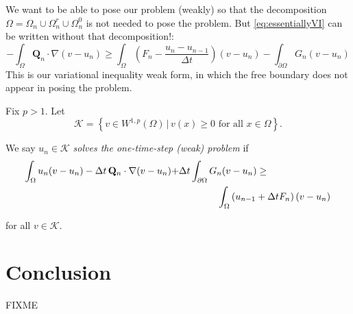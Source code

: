 \documentclass[final,leqno,onefignum,onetabnum]{siamltex1213bueler}
\newcommand\bQ{\mathbf{Q}}
\renewcommand{\grad}{\nabla}
\begin{document}
We want to be able to pose our problem (weakly) so that the decomposition $\Omega = \Omega_n \cup \Omega_n^r \cup \Omega_n^0$ is not needed to pose the problem.  But \eqref{eq:essentiallyVI} can be written without that decomposition!:
\begin{equation}
-\int_{\Omega} \bQ_n \cdot \grad(v-u_n) \ge \int_{\Omega} \left(F_n - \frac{u_n - u_{n-1}}{\Delta t}\right) (v-u_n) - \int_{\partial \Omega} G_n (v-u_n) \label{eq:morallytheVI}
\end{equation}
This is our variational inequality weak form, in which the free boundary does not appear in posing the problem.

\begin{definition}  Fix $p>1$.  Let
    $$\mathcal{K} = \left\{v \in W^{1,p}(\Omega) \,\big|\, v(x) \ge 0 \text{ for all } x \in \Omega\right\}.$$
\end{definition}

\begin{definition}  We say $u_n \in \mathcal{K}$ \emph{solves the one-time-step (weak) problem} if 
\begin{align}
\int_{\Omega} u_n (v-u_n) - \Delta t\, \bQ_n \cdot \grad(v-u_n) + &\Delta t \int_{\partial \Omega} G_n (v-u_n) \ge \label{eq:theVI} \\
  &\qquad\qquad \int_{\Omega} \left(u_{n-1} + \Delta t F_n\right) (v-u_n) \notag
\end{align}
\end{definition}
for all $v \in \mathcal{K}$.



\section{Conclusion}  FIXME





\end{document}

